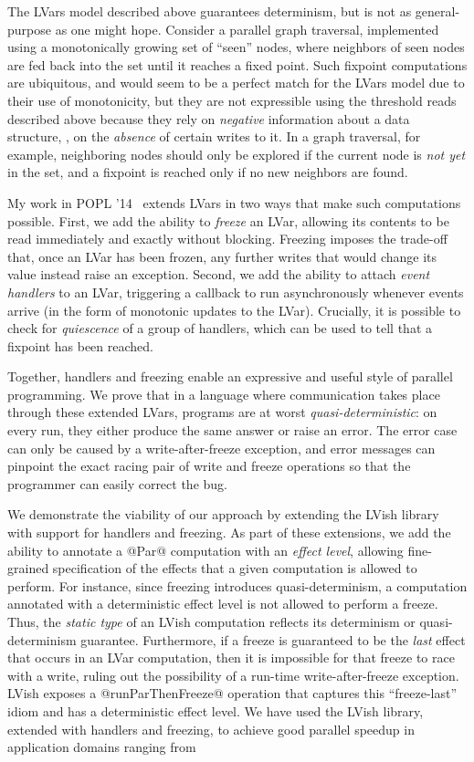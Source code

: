 \documentclass{article}
\begin{document}
The LVars model described above guarantees determinism, but is not as
general-purpose as one might hope.  Consider a parallel graph
traversal, implemented using a monotonically growing set of ``seen''
nodes, where neighbors of seen nodes are fed back into the set until
it reaches a fixed point.  Such fixpoint computations are ubiquitous,
and would seem to be a perfect match for the LVars model due to their
use of monotonicity, but they are not expressible using the threshold
reads described above because they rely on \emph{negative} information
about a data structure, \ie, on the \emph{absence} of certain writes
to it.  In a graph traversal, for example, neighboring nodes should
only be explored if the current node is \emph{not yet} in the set, and
a fixpoint is reached only if no new neighbors are found.

My work in POPL '14~\cite{Freeze-paper, Freeze-TR} extends LVars in
two ways that make such computations possible.  First, we add the
ability to \emph{freeze} an LVar, allowing its contents to be read
immediately and exactly without blocking. Freezing imposes the
trade-off that, once an LVar has been frozen, any further writes that
would change its value instead raise an exception.  Second, we add the
ability to attach \emph{event handlers} to an LVar, triggering a
callback to run asynchronously whenever events arrive (in the form of
monotonic updates to the LVar).  Crucially, it is possible to check
for \emph{quiescence} of a group of handlers, which can be used to
tell that a fixpoint has been reached.

Together, handlers and freezing enable an expressive and useful style
of parallel programming.  We prove that in a language where
communication takes place through these extended LVars, programs are
at worst \emph{quasi-deterministic}: on every run, they either produce
the same answer or raise an error.  The error case can only be caused
by a write-after-freeze exception, and error messages can pinpoint the
exact racing pair of write and freeze operations so that the
programmer can easily correct the bug.

We demonstrate the viability of our approach by extending the LVish
library with support for handlers and freezing.  As part of these
extensions, we add the ability to annotate a @Par@ computation with an
\emph{effect level}, allowing fine-grained specification of the
effects that a given computation is allowed to perform.  For instance,
since freezing introduces quasi-determinism, a computation annotated
with a deterministic effect level is not allowed to perform a freeze.
Thus, the \emph{static type} of an LVish computation reflects its
determinism or quasi-determinism guarantee.  Furthermore, if a freeze
is guaranteed to be the \emph{last} effect that occurs in an LVar
computation, then it is impossible for that freeze to race with a
write, ruling out the possibility of a run-time write-after-freeze
exception.  LVish exposes a @runParThenFreeze@ operation that captures
this ``freeze-last'' idiom and has a deterministic effect level.  We
have used the LVish library, extended with handlers and freezing, to
achieve good parallel speedup in application domains ranging from
\end{document}
